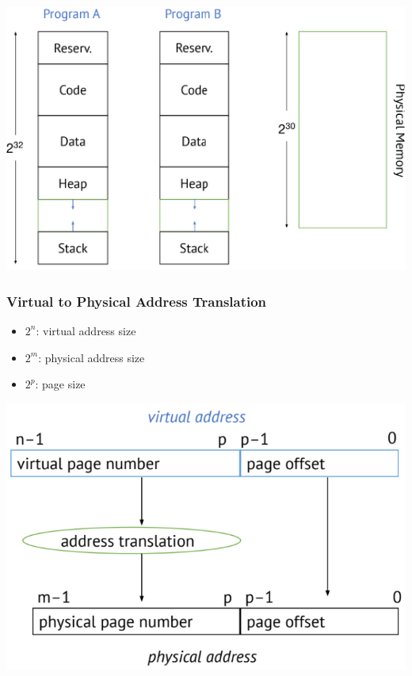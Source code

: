 \documentclass[10pt]{article}
\begin{document}
\begin{itemize}
\begin{center}
        \includegraphics*[scale=0.8]{W7_11.png}
    \end{center}
\end{itemize}

\subsubsection*{Virtual to Physical Address Translation}
\begin{itemize}
    \item $2^n$: virtual address size
    \item $2^m$: physical address size
    \item $2^p$: page size
\end{itemize}
\begin{center}
    \includegraphics*[scale=0.7]{W7_12.png}
\end{center}
\end{document}
